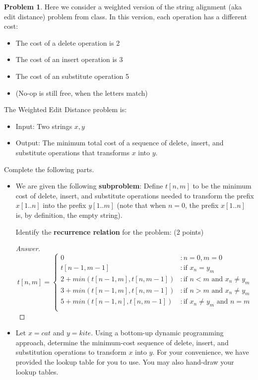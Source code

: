 \documentclass[11pt]{article}
\theoremstyle{definition}
\theoremstyle{definition}
\newtheorem{required}{Problem}
\theoremstyle{definition}
\begin{document}
\setcounter{required}{24}
\begin{required} 
Here we consider a weighted version of the string alignment (aka edit distance) problem from class. In this version, each operation has a different cost:
\begin{itemize}
\item The cost of a \textsf{delete} operation is 2
\item The cost of an \textsf{insert} operation is 3
\item The cost of an \textsf{substitute} operation 5
\item (No-op is still free, when the letters match)
\end{itemize}

The \textsf{Weighted Edit Distance} problem is: 
\begin{itemize}
\item \textsf{Input:} Two strings $x,y$
\item \textsf{Output:} The minimum total cost of a sequence of delete, insert, and substitute operations that transforms $x$ into $y$.
\end{itemize}
Complete the following parts.

\begin{itemize}[(a)]
	\item We are given the following \textbf{subproblem}: Define $t[n,m]$ to be the minimum cost of delete, insert, and substitute operations needed to transform the prefix $x[1..n]$ into the prefix $y[1..m]$ (note that when $n=0$, the prefix $x[1..n]$ is, by definition, the empty string). 
	
	Identify the \textbf{recurrence relation} for the problem: (2 points)
	\begin{proof}[Answer]
		\[
		t[n,m] = \begin{cases}
		0 &:n = 0, m = 0\\
		t[n-1,m-1] &: \text{if $x_n = y_m$}\\
		2 + min(t[n - 1, m], t[n, m - 1]) &: \text{if $n < m$ and $x_n \neq y_m$}\\
		3 + min(t[n - 1, m], t[n, m - 1]) &: \text{if $n > m$ and $x_n \neq y_m$}\\
		5 + min(t[n - 1, n], t[n, m - 1]) &: \text{if $x_n \neq y_m$ and $n = m$}\\
		\end{cases}
		\]
	\end{proof}

	\item Let $x = cat$ and $y = kite$. Using a bottom-up dynamic programming approach, determine the minimum-cost sequence of delete, insert, and substitution operations to transform $x$ into $y$. For your convenience, we have provided the lookup table for you to use. You may also hand-draw your lookup tables.
	

\end{itemize}
\end{required}
\end{document}

